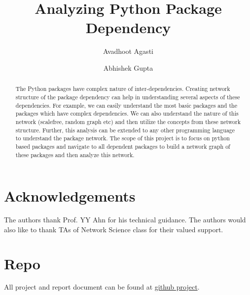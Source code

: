 \documentclass[sigconf]{acmart}
\begin{document}
\title{Analyzing Python Package Dependency}

\author{Avadhoot Agasti}

\author{Abhishek Gupta}

\begin{abstract}

The Python packages have complex nature of inter-dependencies. Creating
network structure of the package dependency can help in understanding several
 aspects of these dependencies. For example, we can easily understand the
 most basic packages and the packages which have complex dependencies. We can
  also understand the nature of this network (scalefree, random graph etc)
  and then utilize the concepts from these network structure.  Further,
this analysis can be extended to any other programming language to understand
the package network. The scope of this project is to focus on python based
packages and navigate to all dependent packages to build a network graph of
these packages and then analyze this network.
\end{abstract}


\maketitle








%

%



\section{Acknowledgements}
 The authors thank Prof. YY Ahn for his technical guidance. The
 authors would also like to thank TAs of Network Science class for their valued
 support. 

\section{Repo} 
 All project and report document can be found at \href{https://github.com/avadhoot-agasti/netsci-project/blob/master/report/main.pdf}{github project}.

\nocite{*}


\end{document}
